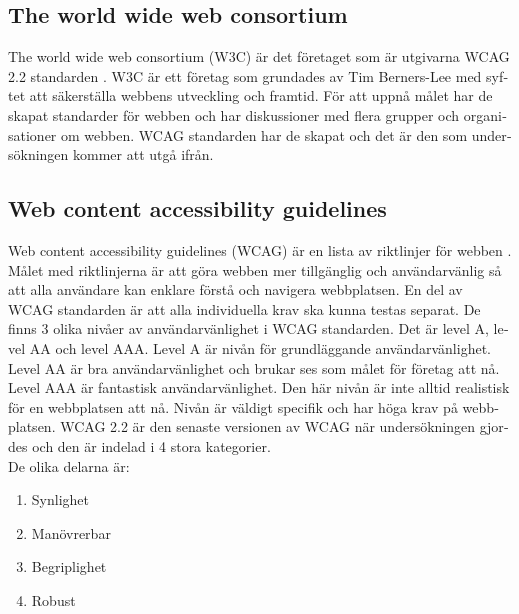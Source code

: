 \documentclass[11p]{article}
\begin{document}
\begin{otherlanguage}{swedish}
    \subsection{The world wide web consortium}
    The world wide web consortium (W3C) är det företaget som är utgivarna WCAG 2.2 standarden \parencite{W3C}.
    W3C är ett företag som grundades av Tim Berners-Lee med syftet att säkerställa webbens utveckling och framtid.
    För att uppnå målet har de skapat standarder för webben och har diskussioner med flera grupper och organisationer om webben.
    WCAG standarden har de skapat och det är den som undersökningen kommer att utgå ifrån.

    \subsection{Web content accessibility guidelines} %
    Web content accessibility guidelines (WCAG) är en lista av riktlinjer för webben \parencite{WCAG_2.2}.
    Målet med riktlinjerna är att göra webben mer tillgänglig och användarvänlig så att alla användare kan enklare förstå och navigera webbplatsen.
    En del av WCAG standarden är att alla individuella krav ska kunna testas separat.
    De finns 3 olika nivåer av användarvänlighet i WCAG standarden.
    Det är level A, level AA och level AAA.
    Level A är nivån för grundläggande användarvänlighet.
    Level AA är bra användarvänlighet och brukar ses som målet för företag att nå. %
    Level AAA är fantastisk användarvänlighet.
    Den här nivån är inte alltid realistisk för en webbplatsen att nå. %
    Nivån är väldigt specifik och har höga krav på webbplatsen.
    WCAG 2.2 är den senaste versionen av WCAG när undersökningen gjordes och den är indelad i 4 stora kategorier.
    \\De olika delarna är:
    \begin{enumerate}
        \item Synlighet %
        \item Manövrerbar
        \item Begriplighet
        \item Robust
    \end{enumerate}


\end{otherlanguage}
\end{document}

